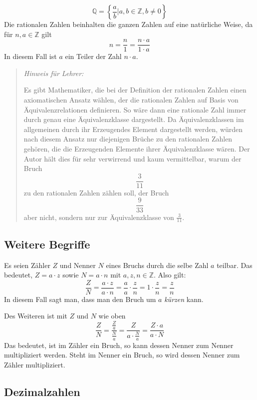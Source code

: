 \[ \mathbb{Q} = \left\{ \frac{a}{b} \vert a,b \in \mathbb{Z}, b\ne 0 \right\} \]
Die rationalen Zahlen beinhalten die ganzen Zahlen auf eine natürliche Weise, da für $n,a\in \mathbb{Z}$ gilt
\[ n = \frac{n}{1} = \frac{n \cdot a}{1\cdot a}\]
In diesem Fall ist $a$ ein Teiler der Zahl $n\cdot a$. 

\begin{quote}
\textsl{Hinweis für Lehrer:}

Es gibt Mathematiker, die bei der Definition der rationalen Zahlen einen axiomatischen Ansatz wählen, der die rationalen Zahlen auf Basis von Äquivalenzrelationen definieren. So wäre dann eine rationale Zahl immer durch genau eine Äquivalenzklasse dargestellt. Da Äquivalenzklassen im allgemeinen durch ihr Erzeugendes Element dargestellt werden, würden nach diesem Ansatz nur diejenigen Brüche zu den rationalen Zahlen gehören, die die Erzeugenden Elemente ihrer Äquivalenzklasse wären. Der Autor hält dies für sehr verwirrend und kaum vermittelbar, warum der Bruch 
\[ \frac{3}{11}\]
zu den rationalen Zahlen zählen soll, der Bruch
\[ \frac{9}{33}\]
aber nicht, sondern nur zur Äquivalenzklasse von $\frac{3}{11}$.
\end{quote}

\subsection{Weitere Begriffe}

\begin{definition}
Es seien Zähler $Z$ und Nenner $N$ eines Bruchs durch die selbe Zahl $a$ teilbar. Das bedeutet, $Z=a\cdot z$ sowie $N=a\cdot n$ mit $a,z,n\in \mathbb{Z}$. Also gilt:
\[
\frac{Z}{N} = \frac{a\cdot z}{a\cdot n} = \frac{a}{a}\cdot \frac{z}{n} = 1\cdot \frac{z}{n} = \frac{z}{n}
\]
In diesem Fall sagt man, dass man den Bruch um $a$ \textsl{kürzen} kann.
\end{definition}

Des Weiteren ist mit $Z$ und $N$ wie oben
\[
\frac{Z}{N} = \frac{\frac{Z}{a}}{\frac{N}{a}} = \frac{Z}{a\cdot \frac{N}{a}} = \frac{Z \cdot a}{a\cdot N}
\]
Das bedeutet, ist im Zähler ein Bruch, so kann dessen Nenner zum Nenner multipliziert werden. Steht im Nenner ein Bruch, so wird dessen Nenner zum Zähler multipliziert. 

\subsection{Dezimalzahlen}

